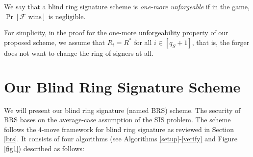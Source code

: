 \documentclass[runningheads]{llncs}
\begin{document}
We say that a blind ring signature scheme  is
\textit{one-more unforgeable} if in the game, $\Pr[\mathcal{F} \text{ wins}]$ is negligible. 
\begin{remark}
	For simplicity, in the proof for the one-more unforgeability property of our proposed scheme, we assume that $R_i=R^*$ for all $i \in [q_S+1]$, that is, the forger does not want to change the ring of signers at all.
\end{remark}






\section{Our Blind Ring Signature Scheme}
\label{brssc}
We will present our blind ring signature (named \textsf{BRS}) scheme. The security of \textsf{BRS} bases on the average-case assumption of the \textsf{SIS} problem. The scheme follows the 4-move framework for blind ring signature as reviewed in Section \ref{brs}. It consists of four algorithms (see Algorithms \ref{setup}-\ref{verify} and Figure \ref{fig1}) described as follows:
\end{document}
